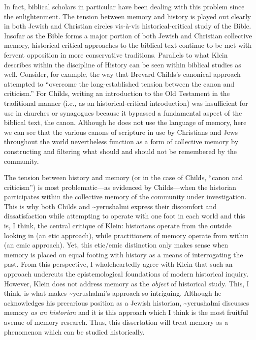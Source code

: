 In fact, biblical scholars in particular have been dealing with this
problem since the enlightenment. The tension between memory and history
is played out clearly in both Jewish and Christian circles vis-à-vis
historical-critical study of the Bible. Insofar as the Bible forms a
major portion of both Jewish and Christian collective memory,
historical-critical approaches to the biblical text continue to be met
with fervent opposition in more conservative traditions. Parallels to
what Klein describes within the discipline of History can be seen within
biblical studies as well. Consider, for example, the way that Brevard
Childs's canonical approach attempted to ``overcome the long-established
tension between the canon and criticism.''\autocite[45]{childs1979} For
Childs, writing an introduction to the Old Testament in the traditional
manner (i.e., as an historical-critical introduction) was insufficient
for use in churches or synagogues because it bypassed a fundamental
aspect of the biblical text, the canon. Although he does not use the
language of memory, here we can see that the various canons of scripture
in use by Christians and Jews throughout the world nevertheless function
as a form of collective memory by constructing and filtering what should
and should not be remembered by the community.

The tension between history and memory (or in the case of Childs,
``canon and criticism'') is most problematic---as evidenced by
Childs---when the historian participates within the collective memory of
the community under investigation. This is why both Childs and
\textasciitilde{}yerushalmi express their discomfort and dissatisfaction
while attempting to operate with one foot in each world and this is, I
think, the central critique of Klein: historians operate from the
outside looking in (an etic approach), while practitioners of memory
operate from within (an emic approach). Yet, this etic/emic distinction
only makes sense when memory is placed on equal footing with history as
a means of interrogating the past. From this perspective, I
wholeheartedly agree with Klein that such an approach undercuts the
epistemological foundations of modern historical inquiry. However, Klein
does not address memory as the \emph{object} of historical study. This,
I think, is what makes \textasciitilde{}yerushalmi's approach so
intriguing. Although he acknowledges his precarious position as a Jewish
historian, \textasciitilde{}yerushalmi discusses memory \emph{as an
historian} and it is this approach which I think is the most fruitful
avenue of memory research. Thus, this dissertation will treat memory as
a phenomenon which can be studied historically.

